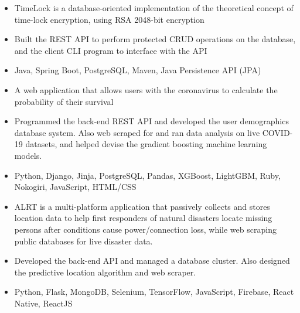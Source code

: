\documentclass[11pt,letterpaper]{article}
\begin{document}
  \iftimelock
    {\fontsize{12}{12}}

    \begin{itemize}
      \item{TimeLock is a database-oriented implementation of the theoretical concept of time-lock encryption, using RSA 2048-bit encryption}

      \item{Built the REST API to perform protected CRUD operations on the database, and the client CLI program to interface with the API}

      \item{
        {}
        Java, Spring Boot, PostgreSQL, Maven, Java Persistence API (JPA)
      }
    \end{itemize}
  \fi

  \ifcovidsurvivalcalculator
    {\fontsize{12}{12}}

    \begin{itemize}
      \item{A web application that allows users with the coronavirus to calculate the probability of their survival}

      \item{Programmed the back-end REST API and developed the user demographics database system. Also web scraped for and ran data analysis on live COVID-19 datasets, and helped devise the gradient boosting machine learning models.}

      \item{
        {}
        Python, Django, Jinja, PostgreSQL, Pandas, XGBoost, LightGBM, Ruby, Nokogiri, JavaScript, HTML/CSS
      }
    \end{itemize}
  \fi

  \ifalrt
    {\fontsize{12}{12}}

    \begin{itemize}
      \item{ALRT is a multi-platform application that passively collects and stores location data to help first responders of natural disasters locate missing persons after conditions cause power/connection loss, while web scraping public databases for live disaster data.}

      \item{Developed the back-end API and managed a database cluster. Also designed the predictive location algorithm and web scraper.}

      \item{
        {}
        Python, Flask, MongoDB, Selenium, TensorFlow, JavaScript, Firebase, React Native, ReactJS
      }
    \end{itemize}
  \fi
\end{document}
